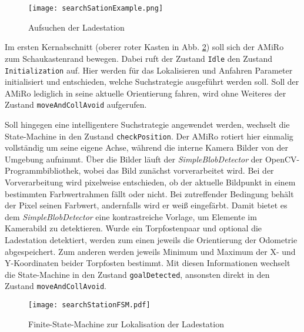 \begin{figure}[H]
	\begin{center}
		\texttt{[image: searchSationExample.png]} 	
		\caption{Aufsuchen der Ladestation}
		\label{fig:searchStationExample}
	\end{center}
\end{figure}

Im ersten Kernabschnitt (oberer roter Kasten in Abb. \ref{fig:searchStationFSM}) soll sich der AMiRo zum Schaukastenrand bewegen. Dabei ruft der Zustand \texttt{Idle} den Zustand \texttt{Initialization} auf. Hier werden für das Lokalisieren und Anfahren Parameter initialisiert und entschieden, welche Suchstrategie ausgeführt werden soll. Soll der AMiRo lediglich in seine aktuelle Orientierung fahren, wird ohne Weiteres der Zustand \texttt{moveAndCollAvoid} aufgerufen. 

Soll hingegen eine intelligentere Suchstrategie angewendet werden, wechselt die State-Machine in den Zustand \texttt{checkPosition}. Der AMiRo rotiert hier einmalig vollständig um seine eigene Achse, während die interne Kamera Bilder von der Umgebung aufnimmt. Über die Bilder läuft der \textit{SimpleBlobDetector} der OpenCV-Programmbibliothek, wobei das Bild zunächst vorverarbeitet wird. Bei der Vorverarbeitung wird pixelweise entschieden, ob der aktuelle Bildpunkt in einem bestimmten Farbwertrahmen fällt oder nicht. Bei zutreffender Bedingung behält der Pixel seinen Farbwert, andernfalls wird er weiß eingefärbt. Damit bietet es dem \textit{SimpleBlobDetector} eine kontrastreiche Vorlage, um Elemente im Kamerabild zu detektieren. Wurde ein Torpfostenpaar und optional die Ladestation detektiert, werden zum einen jeweils die Orientierung der Odometrie abgespeichert. Zum anderen werden jeweils Minimum und Maximum der X- und Y-Koordinaten beider Torpfosten bestimmt. Mit diesen Informationen wechselt die State-Machine in den Zustand \texttt{goalDetected}, ansonsten direkt in den Zustand \texttt{moveAndCollAvoid}.

\begin{figure}[H]
	\begin{center}
		\texttt{[image: searchStationFSM.pdf]} 	
		\caption{Finite-State-Machine zur Lokalisation der Ladestation}
		\label{fig:searchStationFSM}
	\end{center}
\end{figure}

